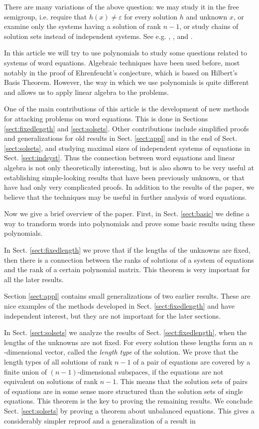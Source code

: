\documentclass[submission]{eptcs}
\theoremstyle{definition}
\newcommand{\eps}{\varepsilon}
\begin{document}
There are many variations of the above question: we may study it in
the free semigroup, i.e. require that $h(x) \ne \eps$ for every
solution $h$ and unknown $x$, or examine only the systems having a
solution of rank $n-1$, or study chains of solution sets instead of
independent systems. See e.g. \cite{HaKaPl02}, \cite{HaKa04},
\cite{Cz08} and \cite{KaSa11}.

In this article we will try to use polynomials to study some
questions related to systems of word equations. Algebraic techniques
have been used before, most notably in the proof of Ehrenfeucht's
conjecture, which is based on Hilbert's Basis Theorem. However, the
way in which we use polynomials is quite different and allows us to
apply linear algebra to the problems.

One of the main contributions of this article is the development of
new methods for attacking problems on word equations. This is done
in Sections \ref{sect:fixedlength} and \ref{sect:solsets}. Other
contributions include simplified proofs and generalizations for old
results in Sect. \ref{sect:appl} and in the end of Sect.
\ref{sect:solsets}, and studying maximal sizes of independent
systems of equations in Sect. \ref{sect:indsyst}. Thus the
connection between word equations and linear algebra is not only
theoretically interesting, but is also shown to be very useful at
establishing simple-looking results that have been previously
unknown, or that have had only very complicated proofs. In addition
to the results of the paper, we believe that the techniques may be
useful in further analysis of word equations.

Now we give a brief overview of the paper. First, in Sect.
\ref{sect:basic} we define a way to transform words into polynomials
and prove some basic results using these polynomials.

In Sect. \ref{sect:fixedlength} we prove that if the lengths of the
unknowns are fixed, then there is a connection between the ranks of
solutions of a system of equations and the rank of a certain
polynomial matrix. This theorem is very important for all the later
results.

Section \ref{sect:appl} contains small generalizations of two
earlier results. These are nice examples of the methods developed in
Sect. \ref{sect:fixedlength} and have independent interest, but they
are not important for the later sections.

In Sect. \ref{sect:solsets} we analyze the results of Sect.
\ref{sect:fixedlength}, when the lengths of the unknowns are not
fixed. For every solution these lengths form an $n$-dimensional
vector, called the \emph{length type} of the solution. We prove that
the length types of all solutions of rank $n-1$ of a pair of
equations are covered by a finite union of $(n-1)$-dimensional
subspaces, if the equations are not equivalent on solutions of rank
$n-1$. This means that the solution sets of pairs of equations are
in some sense more structured than the solution sets of single
equations. This theorem is the key to proving the remaining results.
We conclude Sect. \ref{sect:solsets} by proving a theorem about
unbalanced equations. This gives a considerably simpler reproof and
a generalization of a result in \cite{HaNo03}
\end{document}
